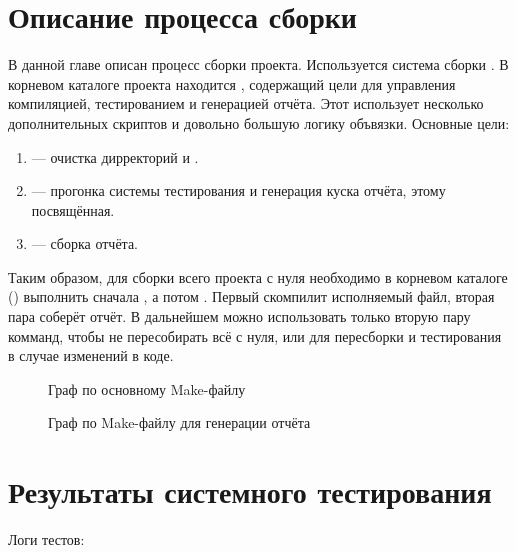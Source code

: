 \chapter{Описание процесса сборки}
В данной главе описан процесс сборки проекта. Используется система сборки . В корневом каталоге проекта находится , содержащий цели для управления компиляцией, тестированием и генерацией отчёта. Этот  использует несколько дополнительных скриптов и довольно большую логику объвязки. Основные цели:

\begin{enumerate}
\item {} --- очистка дирректорий  и .
\item {} --- прогонка системы тестирования и генерация куска отчёта, этому посвящённая.
\item {} --- сборка отчёта. 
\end{enumerate}

Таким образом, для сборки всего проекта с нуля необходимо в корневом каталоге () выполнить сначала , а потом . Первый скомпилит исполняемый файл, вторая пара соберёт отчёт. В дальнейшем можно использовать только вторую пару комманд, чтобы не пересобирать всё с нуля, или  для пересборки и тестирования в случае изменений в коде.

\begin{figure}
\caption{Граф по основному Make-файлу}
\label{make_main:image}
\end{figure}

\begin{figure}
\caption{Граф по Make-файлу для генерации отчёта}
\label{make_report:image}
\end{figure}

\chapter{Результаты системного тестирования}
Логи тестов:




